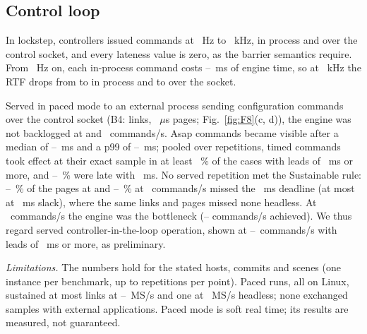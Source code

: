 \subsection{Control loop}\label{sec:wc-loop}
In lockstep, controllers issued \numBfourLockCommands{} commands at
\numBfourRateMinHz~Hz to \numBfourRateMaxKHz~kHz, in process and over the control socket, and
every lateness value is zero, as the barrier semantics require. From \numBfourRateMidHz~Hz on,
each in-process command costs \numBfourCmdCostMinMs--\numBfourCmdCostMaxMs~ms of engine time, so
at \numBfourRateMaxKHz~kHz
the RTF drops from \numBfourRtfNone{} to \numBfourRtfInproc{} in process and to
\numBfourRtfRemote{} over the socket.

Served in paced mode to an external process sending configuration
commands over the control socket (B4: \numBfourLinks{} links, \numBfourPageUs~$\mu$s pages;
Fig.~\ref{fig:F8}(c, d)), the engine was not backlogged at \numBfourRateLowHz{} and
\numBfourRateMidHz~commands/s. Asap commands became visible after a median of
\numBfourVisPfiftyMinMs--\numBfourVisPfiftyMaxMs~ms and a p99 of
\numBfourVisPninetynineMinMs--\numBfourVisPninetynineMaxMs~ms; pooled over repetitions, timed
commands took effect at their exact sample in at least \numBfourExactOkMinPct~\% of the cases
with leads of
\numBfourLeadOkMs~ms or more, and \numBfourLateTwoMinPct--\numBfourLateTwoMaxPct~\% were late
with \numBfourLeadMinMs~ms. No served repetition met the Sustainable rule:
\numBfourMissLowMinPct--\numBfourMissLowMaxPct~\% of the pages at \numBfourRateLowHz{} and
\numBfourMissMidMinPct--\numBfourMissMidMaxPct~\% at \numBfourRateMidHz~commands/s missed the
\numSustainSlackMs~ms deadline (at most \numBfourMissFiveMidMax{} at \numBacklogSlackMs~ms slack),
where the same links and pages missed none headless. At \numBfourRateHighHz~commands/s the
engine was the bottleneck (\numBfourAchievedMin--\numBfourAchievedMax{} commands/s achieved).
We thus regard served controller-in-the-loop operation, shown at
\numBfourRateLowHz--\numBfourRateMidHz~commands/s with leads of \numBfourLeadOkMs~ms or more, as
preliminary.

\emph{Limitations.} The numbers hold for the stated hosts, commits and
scenes (one instance per benchmark, up to \numBthreeReps{} repetitions per point). Paced runs,
all on Linux, sustained at most \numBthreeOneLinks{} links at
\numBthreeLowMsps--\numPacedMSps~MS/s and one at \numBthreeTopMsps~MS/s headless; none
exchanged samples with external applications. Paced mode is soft real time; its results are measured,
not guaranteed.
